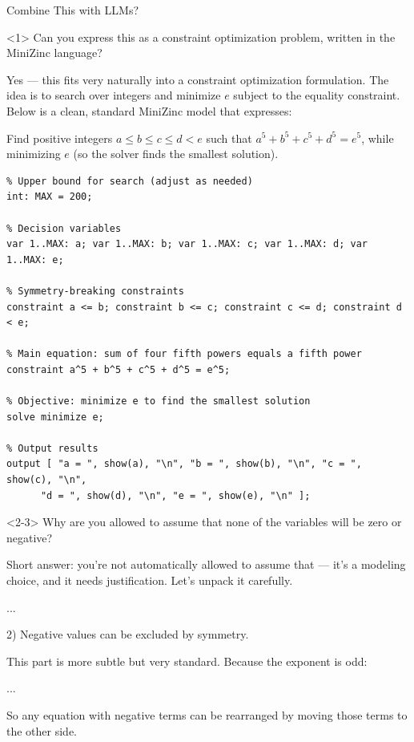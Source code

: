 \documentclass[aspectratio=169,compress,10pt]{beamer}
\begin{document}
\begin{frame}[fragile]{Combine This with LLMs?}
    \begin{onlyenv}<1>
Can you express this as a constraint optimization problem, written in the MiniZinc language?

\medskip
\scriptsize{}


Yes — this fits very naturally into a constraint optimization formulation.
The idea is to search over integers and minimize $e$ subject to the equality constraint.
Below is a clean, standard MiniZinc model that expresses:

    Find positive integers $a \le b \le c \le d < e$ such that
    $a^5 + b^5 + c^5 + d^5 = e^5$, while minimizing $e$
    (so the solver finds the smallest solution).

\begin{Verbatim}
% Upper bound for search (adjust as needed)
int: MAX = 200;

% Decision variables
var 1..MAX: a; var 1..MAX: b; var 1..MAX: c; var 1..MAX: d; var 1..MAX: e;

% Symmetry-breaking constraints
constraint a <= b; constraint b <= c; constraint c <= d; constraint d < e;

% Main equation: sum of four fifth powers equals a fifth power
constraint a^5 + b^5 + c^5 + d^5 = e^5;

% Objective: minimize e to find the smallest solution
solve minimize e;

% Output results
output [ "a = ", show(a), "\n", "b = ", show(b), "\n", "c = ", show(c), "\n",
      "d = ", show(d), "\n", "e = ", show(e), "\n" ];
\end{Verbatim}
\end{onlyenv}\begin{onlyenv}<2-3>
Why are you allowed to assume that none of the variables will be zero or negative?

\medskip
\scriptsize{}
Short answer: you’re not automatically allowed to assume that — it’s a modeling choice, and it needs justification. Let's unpack it carefully.

        ...

2) Negative values can be excluded by symmetry.

This part is more subtle but very standard. Because the exponent is odd:

        ...

So any equation with negative terms can be rearranged by moving those terms to the other side.


\end{onlyenv}
\end{frame}
\end{document}
